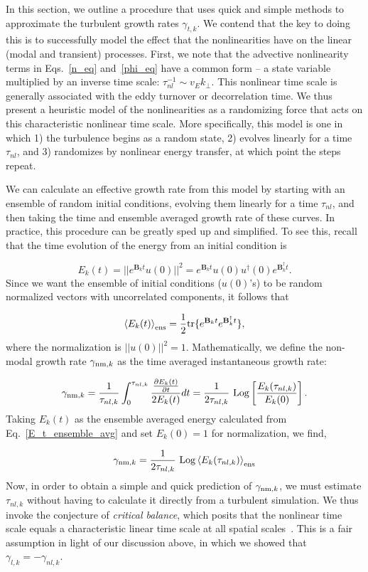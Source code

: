\documentclass[letter,scriptaddress,twocolumn, prl,showkeys]{revtex4}
\def\beq{\begin{equation}}
\def\eeq{\end{equation}}
\newcommand{\pdiff}[2]{\frac{\partial#1}{\partial#2}}
\begin{document}
In this section, we outline a procedure that uses quick and simple methods to approximate the turbulent growth rates $\gamma_{t,k}$.
We contend that the key to doing this is to successfully model the effect that the nonlinearities have on the linear (modal and transient) processes.
First, we note that the advective nonlinearity terms in Eqs.~\ref{n_eq} and~\ref{phi_eq} have a common form -- a state variable multiplied by an inverse time scale:
$\tau_{nl}^{-1} \sim v_E k_\perp$.
This nonlinear time scale is generally associated with the eddy turnover or decorrelation time. We thus present a heuristic model of the nonlinearities 
as a randomizing force that acts on this characteristic nonlinear time scale. More specifically, this model is one in which 1) the turbulence begins as a random state, 
2) evolves linearly for a time $\tau_{nl}$, and 3) randomizes by nonlinear energy transfer, at which point the steps repeat.

We can calculate an effective growth rate from this model by starting with an ensemble of random initial conditions, evolving them linearly for a time $\tau_{nl}$, and
then taking the time and ensemble averaged growth rate of these curves.
In practice, this procedure can be greatly sped up and simplified. To see this, recall that the time evolution of the energy from an initial condition is

\beq
\label{E_t_from_u0}
E_k(t) = ||e^{\mathbf{B}_k t} u(0)||^2 = e^{\mathbf{B}_k t} u(0) u^{\dagger}(0) e^{\mathbf{B}_k^{\dagger}t}.
\eeq
Since we want the ensemble of initial conditions ($u(0)$'s) to be random normalized vectors with uncorrelated components, it follows that~\cite{camargo1998}

\beq
\label{E_t_ensemble_avg}
\left< E_k(t) \right>_{{\rm{ens}}} = \frac{1}{2} {\rm{tr}} \{ e^{\mathbf{B}_k t} e^{\mathbf{B}_k^{\dagger}t} \},
\eeq
where the normalization is $||u(0)||^2 = 1$. Mathematically, we define the non-modal growth rate $\gamma_{{\rm{nm}},k}$ as the time averaged instantaneous growth rate:

\beq
\label{gamma_nm_calc}
\gamma_{{\rm{nm}},k} = \frac{1}{\tau_{nl,k}} \int_0^{\tau_{nl,k}} \frac{\pdiff{E_k(t)}{t}}{2 E_k(t)} dt = \frac{1}{2 \tau_{nl,k}} \ {\rm{Log}} \left[ \frac{E_k(\tau_{nl,k})}{E_k(0)}\right].
\eeq
Taking $E_k(t)$ as the ensemble averaged energy calculated from Eq.~\ref{E_t_ensemble_avg} and set $E_k(0) = 1$ for normalization, we find,

\beq
\label{gamma_nm}
\gamma_{{\rm{nm}},k} = \frac{1}{2 \tau_{nl,k}} \ {\rm{Log}} \left<  E_k(\tau_{nl,k}) \right>_{\rm{ens}}
\eeq
Now, in order to obtain a simple and quick prediction of $\gamma_{{\rm{nm}},k}$, we must estimate $\tau_{nl,k}$ without having to calculate it directly from a turbulent simulation. 
We thus invoke the conjecture of \emph{critical balance}, which posits that the nonlinear time scale equals a characteristic linear time scale at all spatial scales~\cite{schekochihin2012}. 
This is a fair assumption in light of our discussion above, in which we showed that $\gamma_{l,k} = - \gamma_{nl,k}$.
\end{document}
